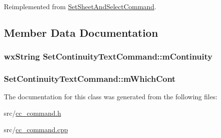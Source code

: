 Reimplemented from \hyperlink{a00132_ae017079a0a6c65222f10968fad8fc082}{Set\-Sheet\-And\-Select\-Command}.



\subsection{Member Data Documentation}
\hypertarget{a00124_aa487d13de203c5a946bf4dbf4b3d7d11}{
\subsubsection[{m\-Continuity}]{\setlength{\rightskip}{0pt plus 5cm}wx\-String Set\-Continuity\-Text\-Command\-::m\-Continuity\hspace{0.3cm}{\ttfamily [protected]}}}\label{a00124_aa487d13de203c5a946bf4dbf4b3d7d11}
\hypertarget{a00124_af7d76e985b20142b77f724ed3619a6ac}{
\subsubsection[{m\-Which\-Cont}]{ Set\-Continuity\-Text\-Command\-::m\-Which\-Cont\hspace{0.3cm}{\ttfamily [protected]}}}\label{a00124_af7d76e985b20142b77f724ed3619a6ac}


The documentation for this class was generated from the following files\-:\begin{DoxyCompactItemize}
\item 
src/\hyperlink{a00183}{cc\-\_\-command.\-h}\item 
src/\hyperlink{a00182}{cc\-\_\-command.\-cpp}\end{DoxyCompactItemize}
